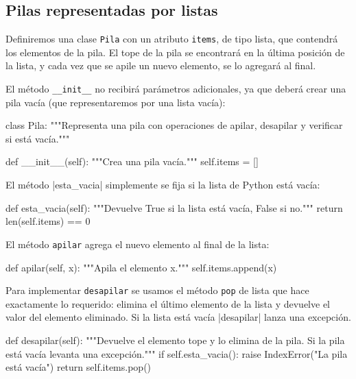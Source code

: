 \subsection{Pilas representadas por listas}

Definiremos una clase \lstinline!Pila! con un atributo \lstinline!items!,
de tipo lista, que contendrá los elementos de la pila. El tope de la pila
se encontrará en la última posición de la lista, y cada vez que se apile un
nuevo elemento, se lo agregará al final.

El método \lstinline+__init__+ no recibirá parámetros adicionales, ya que
deberá crear una pila vacía (que representaremos por una lista vacía):

\begin{codigo-python-sn}
class Pila:
    """Representa una pila con operaciones de apilar, desapilar y
       verificar si está vacía."""

    def __init__(self):
        """Crea una pila vacía."""
        self.items = []
\end{codigo-python-sn}

El método |esta_vacia| simplemente se fija si la lista de Python está vacía:

\begin{codigo-python-sn}
    def esta_vacia(self):
        """Devuelve True si la lista está vacía, False si no."""
        return len(self.items) == 0
\end{codigo-python-sn}

El método \lstinline!apilar! agrega el nuevo elemento al
final de la lista:

\begin{codigo-python-sn}
    def apilar(self, x):
        """Apila el elemento x."""
        self.items.append(x)
\end{codigo-python-sn}

Para implementar \lstinline!desapilar! se usamos el método \lstinline!pop!
de lista que hace exactamente lo requerido: elimina el último elemento de
la lista y devuelve el valor del elemento eliminado. Si la lista está vacía
|desapilar| lanza una excepción.

\begin{codigo-python-sn}
    def desapilar(self):
        """Devuelve el elemento tope y lo elimina de la pila.
           Si la pila está vacía levanta una excepción."""
        if self.esta_vacia():
            raise IndexError("La pila está vacía")
        return self.items.pop()
\end{codigo-python-sn}

